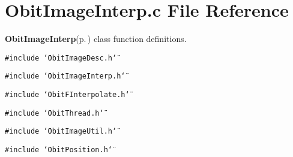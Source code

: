\section{Obit\-Image\-Interp.c File Reference}
\label{ObitImageInterp_8c}
{\bf Obit\-Image\-Interp}{\rm (p.\,\pageref{structObitImageInterp})} class function definitions. 

{\tt \#include \char`\"{}Obit\-Image\-Desc.h\char`\"{}}\par
{\tt \#include \char`\"{}Obit\-Image\-Interp.h\char`\"{}}\par
{\tt \#include \char`\"{}Obit\-FInterpolate.h\char`\"{}}\par
{\tt \#include \char`\"{}Obit\-Thread.h\char`\"{}}\par
{\tt \#include \char`\"{}Obit\-Image\-Util.h\char`\"{}}\par
{\tt \#include \char`\"{}Obit\-Position.h\char`\"{}}\par
